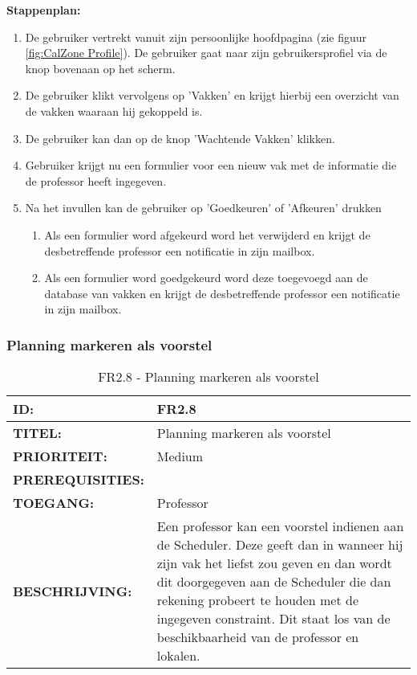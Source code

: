 \textbf{Stappenplan:}
	\begin{enumerate}
	\item De gebruiker vertrekt vanuit zijn persoonlijke hoofdpagina (zie figuur \ref{fig:CalZone Profile}). De gebruiker gaat naar zijn gebruikersprofiel via de knop bovenaan op het scherm.
	\item De gebruiker klikt vervolgens op 'Vakken' en krijgt hierbij een overzicht van de vakken waaraan hij gekoppeld is.
	\item De gebruiker kan dan op de knop 'Wachtende Vakken' klikken.
	\item Gebruiker krijgt nu een formulier voor een nieuw vak met de informatie die de professor heeft ingegeven.
	\item Na het invullen kan de gebruiker op 'Goedkeuren' of 'Afkeuren' drukken
		\begin{enumerate}
		\item Als een formulier word afgekeurd word het verwijderd en krijgt de desbetreffende professor een notificatie in zijn mailbox.
		\item Als een formulier word goedgekeurd word deze toegevoegd aan de database van vakken en krijgt de desbetreffende professor een notificatie in zijn mailbox.
		\end{enumerate}
	\end{enumerate}       
         
\subsubsection{Planning markeren als voorstel}         
\noindent\begin{table}[H]
            \begin{tabular}{l | p{10cm}}
                \textbf{ID:} & FR2.8 \\ \hline
                \textbf{TITEL:} & Planning markeren als voorstel\\ \hline
                \textbf{PRIORITEIT:} &  Medium \\ \hline
                \textbf{PREREQUISITIES:} & \\ \hline
                \textbf{TOEGANG:} & Professor \\ \hline
                \textbf{BESCHRIJVING:} & Een professor kan een voorstel indienen aan de Scheduler. 
                                        Deze geeft dan in wanneer hij zijn vak het liefst zou geven en dan wordt dit doorgegeven aan de Scheduler die dan rekening probeert te houden met de ingegeven constraint. Dit staat los van de beschikbaarheid van de professor en lokalen.  \\
            \end{tabular}\\
            \caption{FR2.8 - Planning markeren als voorstel}
            \label{tab:FR2.8 - Planning markeren als voorstel}
        \end{table}
        
